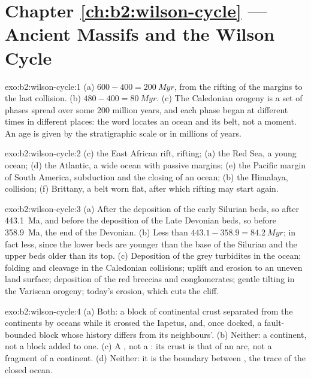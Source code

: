 \section*{Chapter \ref{ch:b2:wilson-cycle} --- Ancient Massifs and the Wilson Cycle}

\begin{solution}{exo:b2:wilson-cycle:1}
(a) $600 - 400 = \qty{200}{Myr}$, from the rifting of the margins to the last collision.
(b) $480 - 400 = \qty{80}{Myr}$. (c) The Caledonian orogeny is a set of phases spread over
some 200 million years, and each phase began at different times in different places: the word
locates an ocean and its belt, not a moment. An age is given by the stratigraphic scale or in
millions of years.
\end{solution}

\begin{solution}{exo:b2:wilson-cycle:2}
(c) the East African rift, rifting; (a) the Red Sea, a young ocean; (d) the Atlantic, a wide
ocean with passive margins; (e) the Pacific margin of South America, subduction and the
closing of an ocean; (b) the Himalaya, collision; (f) Brittany, a belt worn flat, after which
rifting may start again.
\end{solution}

\begin{solution}{exo:b2:wilson-cycle:3}
(a) After the deposition of the early Silurian beds, so after \qty{443.1}{Ma}, and before the
deposition of the Late Devonian beds, so before \qty{358.9}{Ma}, the end of the Devonian.
(b) Less than $443.1 - 358.9 = \qty{84.2}{Myr}$; in fact less, since the lower beds are younger
than the base of the Silurian and the upper beds older than its top. (c) Deposition of the
grey turbidites in the ocean; folding and cleavage in the Caledonian collisions; uplift and
erosion to an uneven land surface; deposition of the red breccias and conglomerates; gentle
tilting in the Variscan orogeny; today's erosion, which cuts the cliff.
\end{solution}

\begin{solution}{exo:b2:wilson-cycle:4}
(a) Both: a block of continental crust separated from the continents by oceans while it
crossed the Iapetus, and, once docked, a fault-bounded block whose history differs from its
neighbours'. (b) Neither: a continent, not a block added to one. (c) A , not a
: its crust is that of an arc, not a fragment of a continent. (d) Neither: it is
the boundary between , the trace of the closed ocean.
\end{solution}

